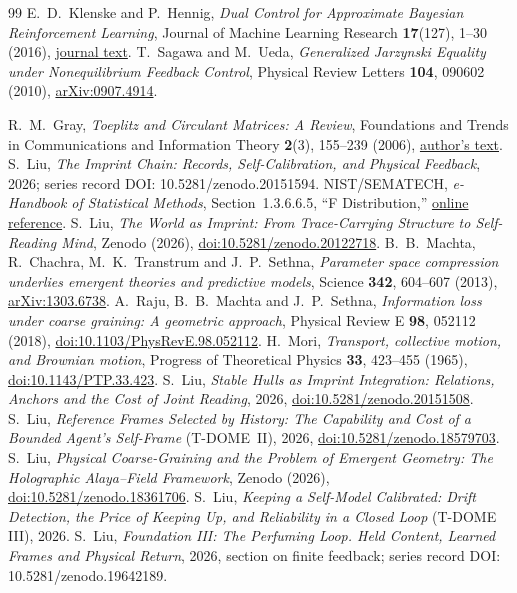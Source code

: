 \documentclass[12pt,a4paper]{article}
\begin{document}
\begin{thebibliography}{99}
E.~D.~Klenske and P.~Hennig,
\emph{Dual Control for Approximate Bayesian Reinforcement Learning},
Journal of Machine Learning Research \textbf{17}(127), 1--30 (2016),
\href{https://jmlr.org/papers/v17/15-162.html}{journal text}.
T.~Sagawa and M.~Ueda,
\emph{Generalized Jarzynski Equality under Nonequilibrium Feedback Control},
Physical Review Letters \textbf{104}, 090602 (2010),
\href{https://arxiv.org/abs/0907.4914}{arXiv:0907.4914}.
\raggedright
{}
R.~M.~Gray, \emph{Toeplitz and Circulant Matrices: A Review},
Foundations and Trends in Communications and Information Theory
\textbf{2}(3), 155--239 (2006),
\href{https://ee.stanford.edu/~gray/CIT006-journal.pdf}{author's text}.
S.~Liu, \emph{The Imprint Chain: Records, Self-Calibration, and
Physical Feedback}, 2026;
series record DOI: 10.5281/zenodo.20151594.
NIST/SEMATECH, \emph{e-Handbook of Statistical Methods},
Section~1.3.6.6.5, ``F Distribution,''
\href{https://www.itl.nist.gov/div898/handbook/eda/section3/eda3665.htm}{online reference}.
S.~Liu, \emph{The World as Imprint: From Trace-Carrying Structure
to Self-Reading Mind}, Zenodo (2026),
\href{https://doi.org/10.5281/zenodo.20122718}{doi:10.5281/zenodo.20122718}.
B.~B.~Machta, R.~Chachra, M.~K.~Transtrum and J.~P.~Sethna,
\emph{Parameter space compression underlies emergent theories and
predictive models}, Science \textbf{342}, 604--607 (2013),
\href{https://arxiv.org/abs/1303.6738}{arXiv:1303.6738}.
A.~Raju, B.~B.~Machta and J.~P.~Sethna,
\emph{Information loss under coarse graining: A geometric approach},
Physical Review E \textbf{98}, 052112 (2018),
\href{https://doi.org/10.1103/PhysRevE.98.052112}{doi:10.1103/PhysRevE.98.052112}.
H.~Mori, \emph{Transport, collective motion, and Brownian motion},
Progress of Theoretical Physics \textbf{33}, 423--455 (1965),
\href{https://doi.org/10.1143/PTP.33.423}{doi:10.1143/PTP.33.423}.
S.~Liu, \emph{Stable Hulls as Imprint Integration: Relations, Anchors
and the Cost of Joint Reading}, 2026,
\href{https://doi.org/10.5281/zenodo.20151508}{doi:10.5281/zenodo.20151508}.
S.~Liu, \emph{Reference Frames Selected by History: The Capability and
Cost of a Bounded Agent's Self-Frame} (T-DOME~II), 2026,
\href{https://doi.org/10.5281/zenodo.18579703}{doi:10.5281/zenodo.18579703}.
S.~Liu, \emph{Physical Coarse-Graining and the Problem of Emergent Geometry: The Holographic Alaya--Field Framework}, Zenodo (2026),
\href{https://doi.org/10.5281/zenodo.18361706}{doi:10.5281/zenodo.18361706}.
S.~Liu, \emph{Keeping a Self-Model Calibrated: Drift Detection, the
Price of Keeping Up, and Reliability in a Closed Loop} (T-DOME III),
2026.
S.~Liu, \emph{Foundation III: The Perfuming Loop.
Held Content, Learned Frames and Physical Return}, 2026,
section on finite feedback; series record DOI: 10.5281/zenodo.19642189.
\end{thebibliography}
\end{document}
